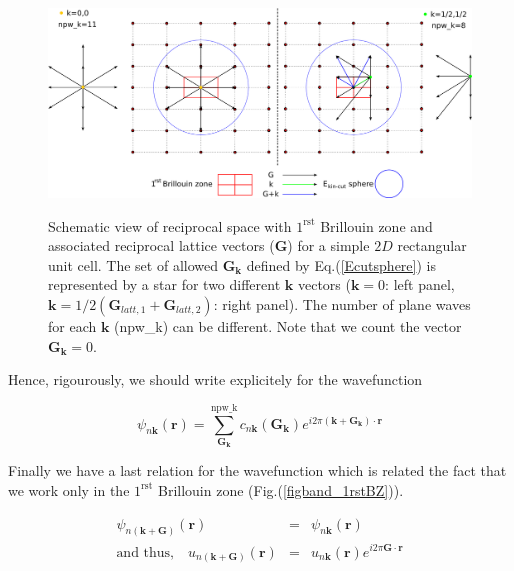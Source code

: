 \documentclass[a4paper,12pt]{report}
\begin{document}
\begin{figure}[!h]
\centering
\begin{minipage}[c]{1.0\textwidth}
\includegraphics[width = \textwidth]{sphere_Gk}
\end{minipage}
\vspace{0.12\textwidth}
\begin{minipage}[c]{0.9\textwidth}
\caption{\small Schematic view of reciprocal space with $1^{\text{rst}}$ Brillouin zone and associated reciprocal lattice vectors ($\mathbf{G}$) for a simple $2D$ rectangular unit cell. The set of allowed $\mathbf{G}_{\mathbf{k}}$ defined by Eq.(\ref{Ecutsphere}) is represented by a star for two different $\mathbf{k}$ vectors ($\mathbf{k}=0$: left panel, $\mathbf{k}=1/2(\mathbf{G}_{latt,1}+\mathbf{G}_{latt,2})$: right panel). The number of plane waves for each $\mathbf{k}$ (npw\_k) can be different. Note that we count the vector $\mathbf{G}_{\mathbf{k}} = 0$.}
\vspace*{1.0ex}
\label{sphere_Gk}
\end{minipage}
\end{figure}

Hence, rigourously, we should write explicitely for the wavefunction

\begin{equation}
\psi_{n\mathbf{k}}(\mathbf{r}) = \sum_{\mathbf{G_{\mathbf{k}}}}^{\text{npw\_k}} c_{n\mathbf{k}}(\mathbf{G}_{\mathbf{k}}) e^{i2\pi \left(  \mathbf{k} +\mathbf{G}_{\mathbf{k}}\right) \cdotp\mathbf{r}}
\end{equation}

Finally we have a last relation for the wavefunction which is related the fact that we work only in the $1^{\text{rst}}$ Brillouin zone (Fig.(\ref{figband_1rstBZ})).

\begin{eqnarray}
\psi_{n(\mathbf{k}+\mathbf{G})}(\mathbf{r}) &=& \psi_{n\mathbf{k}}(\mathbf{r}) \nonumber \\
\text{and thus,}\quad u_{n(\mathbf{k}+\mathbf{G})}(\mathbf{r}) &=& u_{n\mathbf{k}}(\mathbf{r}) e^{i2\pi \mathbf{G}\cdotp\mathbf{r}} \nonumber
\end{eqnarray}
\end{document}
